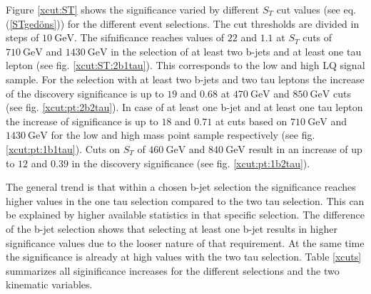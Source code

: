 %
Figure \ref{xcut:ST} shows the significance varied by different $S_T$ cut values (see eq. (\ref{STgedöns})) for the different event selections. The cut thresholds are divided in steps of $\SI{10}{\giga\electronvolt}$. The sifnificance reaches values of $22$ and $1.1$ at $S_T$ cuts of $\SI{710}{\giga\electronvolt}$ and $\SI{1430}{\giga\electronvolt}$ in the selection of at least two b-jets and at least one tau lepton (see fig. \ref{xcut:ST:2b1tau}). This corresponds to the low and high LQ signal sample. For the selection with at least two b-jets and two tau leptons the increase of the discovery significance is up to $19$ and $0.68$ at $\SI{470}{\giga\electronvolt}$ and $\SI{850}{\giga\electronvolt}$ cuts (see fig. \ref{xcut:pt:2b2tau}). In case of at least one b-jet and at least one tau lepton the increase of significance is up to $18$ and $0.71$ at cuts based on $\SI{710}{\giga\electronvolt}$ and $\SI{1430}{\giga\electronvolt}$ for the low and high mass point sample respectively (see fig. \ref{xcut:pt:1b1tau}). Cuts on $S_T$ of $\SI{460}{\giga\electronvolt}$ and $\SI{840}{\giga\electronvolt}$ result in an increase of up to $12$ and $0.39$ in the discovery significance (see fig. \ref{xcut:pt:1b2tau}).\par
The general trend is that within a chosen b-jet selection the significance reaches higher values in the one tau selection compared to the two tau selection. This can be explained by higher available statistics in that specific selection. The difference of the b-jet selection shows that selecting at least one b-jet results in higher significance values due to the looser nature of that requirement. At the same time the significance is already at high values with the two tau selection. Table \ref{xcuts} summarizes all siginificance increases for the different selections and the two kinematic variables.
%	

